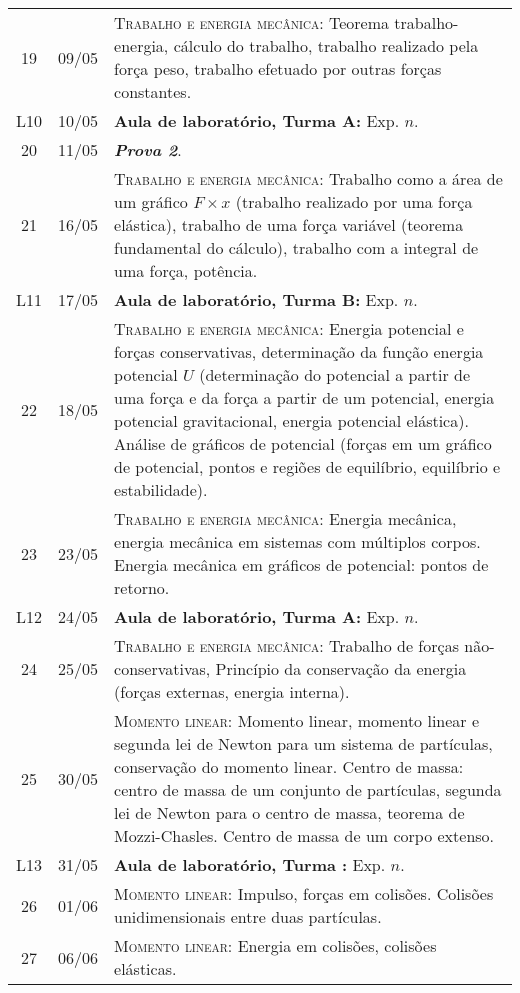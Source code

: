 \begin{center}
\begin{longtable}{ccp{70mm}}
19	 & 	09/05	 & 	\textsc{Trabalho e energia mecânica:} Teorema trabalho-energia, cálculo do trabalho, trabalho realizado pela força peso, trabalho efetuado por outras forças constantes.\\
L10  &  10/05    &  \textbf{Aula de laboratório, Turma A:} Exp. $n$. \\
20	 & 	11/05	 & 	\textbf{\textit{Prova 2}}. \\
21	 & 	16/05	 & 	\textsc{Trabalho e energia mecânica:} Trabalho como a área de um gráfico $F \times x$ (trabalho realizado por uma força elástica), trabalho de uma força variável (teorema fundamental do cálculo), trabalho com a integral de uma força, potência. \\
L11  &  17/05    &  \textbf{Aula de laboratório, Turma B:} Exp. $n$. \\
22	 & 	18/05	 & 	\textsc{Trabalho e energia mecânica:} Energia potencial e forças conservativas, determinação da função energia potencial $U$ (determinação do potencial a partir de uma força e da força a partir de um potencial, energia potencial gravitacional, energia potencial elástica). Análise de gráficos de potencial (forças em um gráfico de potencial, pontos e regiões de equilíbrio, equilíbrio e estabilidade).\\
23	 & 	23/05	 & 	\textsc{Trabalho e energia mecânica:} Energia mecânica, energia mecânica em sistemas com múltiplos corpos. Energia mecânica em gráficos de potencial: pontos de retorno. \\
L12  &  24/05    &  \textbf{Aula de laboratório, Turma A:} Exp. $n$. \\
24	 & 	25/05	 & 	\textsc{Trabalho e energia mecânica:} Trabalho de forças não-conservativas, Princípio da conservação da energia (forças externas, energia interna). \\
25	 & 	30/05	 & 	\textsc{Momento linear:} Momento linear, momento linear e segunda lei de Newton para um sistema de partículas, conservação do momento linear. Centro de massa: centro de massa de um conjunto de partículas, segunda lei de Newton para o centro de massa, teorema de Mozzi-Chasles. Centro de massa de um corpo extenso.\\
L13  &  31/05    &  \textbf{Aula de laboratório, Turma :} Exp. $n$.\\
26	 & 	01/06	 & 	\textsc{Momento linear:} Impulso, forças em colisões. Colisões unidimensionais entre duas partículas. \\
27	 & 	06/06	 & 	\textsc{Momento linear:} Energia em colisões, colisões elásticas. \\

\end{longtable}
\end{center}
